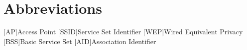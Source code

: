 \appendix
\renewcommand{\appendixtocname}{Appendix}
\renewcommand{\appendixpagename}{\appendixtocname}
\addappheadtotoc
{}
\appendixpage

\chapter{Abbreviations}

\begin{acronym}[\hspace{3cm}]
  [AP]{Access Point}
  [SSID]{Service Set Identifier}
  [WEP]{Wired Equivalent Privacy}
  [BSS]{Basic Service Set}
  [AID]{Association Identifier}
\end{acronym}

\clearpage
\listoffigures
{}
